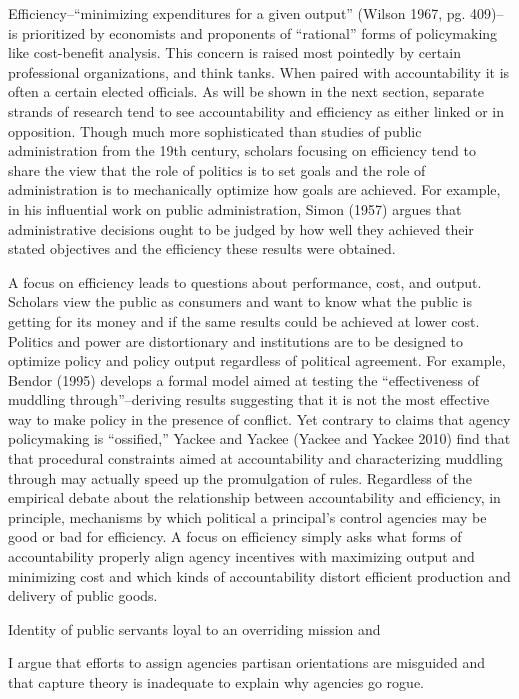 Efficiency--``minimizing expenditures for a given output'' (Wilson 1967, pg. 409)--is prioritized by economists and proponents of ``rational'' forms of policymaking like cost-benefit analysis. This concern is raised most pointedly by certain professional organizations, and think tanks. When paired with accountability it is often a certain elected officials. As will be shown in the next section, separate strands of research tend to see accountability and efficiency as either linked or in opposition. Though much more sophisticated than studies of public administration from the 19th century, scholars focusing on efficiency tend to share the view that the role of politics is to set goals and the role of administration is to mechanically optimize how goals are achieved. For example, in his influential work on public administration, Simon (1957) argues that administrative decisions ought to be judged by how well they achieved their stated objectives and the efficiency these results were obtained. 

A focus on efficiency leads to questions about performance, cost, and output. Scholars view the public as consumers and want to know what the public is getting for its money and if the same results could be achieved at lower cost. Politics and power are distortionary and institutions are to be designed to optimize policy and policy output regardless of political agreement. For example, Bendor (1995) develops a formal model aimed at testing the ``effectiveness of muddling through''--deriving results suggesting that it is not the most effective way to make policy in the presence of conflict. Yet contrary to claims that agency policymaking is ``ossified,'' Yackee and Yackee (Yackee and Yackee 2010) find that that procedural constraints aimed at accountability and characterizing muddling through may actually speed up the promulgation of rules. Regardless of the empirical debate about the relationship between accountability and efficiency, in principle, mechanisms by which political a principal's control agencies may be good or bad for efficiency. A focus on efficiency simply asks what forms of accountability properly align agency incentives with maximizing output and minimizing cost and which kinds of accountability distort efficient production and delivery of public goods. 

Identity of public servants loyal to an overriding mission and 
 
I argue that efforts to assign agencies partisan orientations are misguided and that capture theory is inadequate to explain why agencies go rogue.
 

